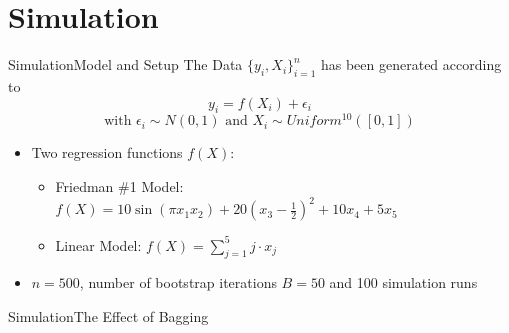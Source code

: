 \documentclass{beamer}
\begin{document}
\section{Simulation}


\begin{frame}{Simulation}{Model and Setup}
The Data $\{y_{i},X_{i} \}_{i=1}^{n}$ has been generated according to $$y_{i} = f(X_{i}) + \epsilon_{i}$$
$$\text{with }\epsilon_{i} \sim N(0,1) \text{ and } X_{i} \sim Uniform^{10}([0,1])$$
\begin{itemize}
\item Two regression functions $f(X)$:
\begin{itemize}
\item Friedman \#1 Model: $f(X) = 10 \sin(\pi x_{1} x_{2}) + 20(x_{3} - \frac{1}{2})^{2} + 10 x_{4} + 5 x_{5} $
\item Linear Model: \hspace{9mm} $f(X) = \sum_{j=1}^{5} j \cdot x_{j} $
\end{itemize}
\item $n=500$, number of bootstrap iterations $B=50$ and 100 simulation runs
\end{itemize}


\end{frame}


\begin{frame}{Simulation}{The Effect of Bagging}
\begin{table}
\caption{The effect of bagging using regression trees. The relative error is defined as $(MSE_{\text{Tree}} - MSE_{\text{Bagging}})/ MSE_{\text{Bagging}}$.}
\end{table}

\end{frame}
\end{document}
